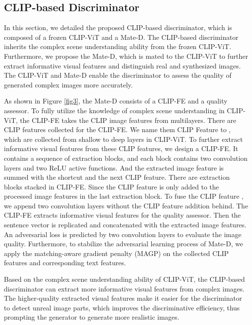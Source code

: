 \documentclass[10pt,twocolumn,letterpaper]{article}
\begin{document}
\subsection{CLIP-based Discriminator}


In this section, we detailed the proposed CLIP-based discriminator, which is composed of a frozen CLIP-ViT and a Mate-D. 
The CLIP-based discriminator inherits the complex scene understanding ability from the frozen CLIP-ViT.
Furthermore, we propose the Mate-D, which is mated to the CLIP-ViT to further extract informative visual features and distinguish real and synthesized images.
The CLIP-ViT and Mate-D enable the discriminator to assess the quality of generated complex images more accurately. 

As shown in Figure \ref{fig3}, the Mate-D consists of a CLIP-FE and a quality assessor.
To fully utilize the knowledge of complex scene understanding in CLIP-ViT,
the CLIP-FE takes the CLIP image features from multilayers.
There are  CLIP features collected for the CLIP-FE.
We name them CLIP Feature  to , which are collected from shallow to deep layers in CLIP-ViT.
To further extract informative visual features from these CLIP features, we design a CLIP-FE.
It contains a sequence of extraction blocks, and each block contains two convolution layers and two ReLU active functions.
And the extracted image feature is summed with the shortcut and the next CLIP feature.
There are  extraction blocks stacked in CLIP-FE.
Since the CLIP feature  is only added to the processed image features in the last extraction block.
To fuse the CLIP feature , we append two convolution layers without the CLIP feature addition behind. 
The CLIP-FE extracts informative visual features for the quality assessor. 
Then the sentence vector is replicated and concatenated with the extracted image features.
An adversarial loss is predicted by two convolution layers to evaluate the image quality. 
Furthermore, to stabilize the adversarial learning process of Mate-D, we apply the matching-aware gradient penalty (MAGP) \cite{tao2020df} on the collected CLIP features and corresponding text features.

Based on the complex scene understanding ability of CLIP-ViT, the CLIP-based discriminator can extract more informative visual features from complex images.
The higher-quality extracted visual features make it easier for the discriminator to detect unreal image parts, which improves the discriminative efficiency, thus prompting the generator to generate more realistic images.
\end{document}
